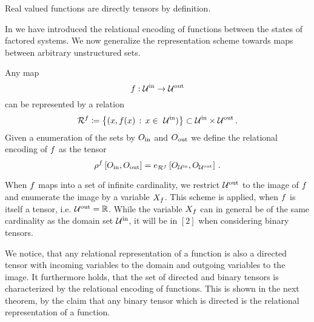 
Real valued functions are directly tensors by definition.


In  we have introduced the relational encoding of functions between the states of factored systems.
We now generalize the representation scheme towards maps between arbitrary unstructured sets.

\begin{definition}\label{def:functionRelationEncoding}
	Any map
		\[ f : \mathcal{U}^{\mathrm{in}} \rightarrow \mathcal{U}^{\mathrm{out}} \]
	can be represented by a relation
		\[ \exrelationof{\exfunction} \coloneqq \left\{ (x,\exfunction(x) \, : \, x \in \inset )\right\} \subset \inset \times \outset \, . \]
	Given a enumeration of the sets by $O_{\mathrm{in}}$ and $O_{\mathrm{out}}$ we define the relational encoding of $f$ as the tensor
		\[ \rho^{f}\left[O_{\mathrm{in}},O_{\mathrm{out}}\right] = e_{\mathcal{R}^{f}}\left[O_{\mathcal{U}^{\mathrm{in}}},O_{\mathcal{U}^{\mathrm{out}}}\right]  \, . \]
\end{definition}

\begin{remark}
	When $f$ maps into a set of infinite cardinality, we restrict $\mathcal{U}^{\mathrm{out}}$ to the image of $f$ and enumerate the image by a variable $X_{f}$.
	This scheme is applied, when $f$ is itself a tensor, i.e. $\mathcal{U}^{\mathrm{out}}=\mathbb{R}$.
	While the variable $X_{f}$ can in general be of the same cardinality as the domain set $\mathcal{U}^{\mathrm{in}}$, it will be in $[2]$ when considering binary tensors.
\end{remark}

We notice, that any relational representation of a function is also a directed tensor with incoming variables to the domain and outgoing variables to the image.
It furthermore holds, that the set of directed and binary tensors is characterized by the relational encoding of functions.
This is shown in the next theorem, by the claim that any binary tensor which is directed is the relational representation of a function.

